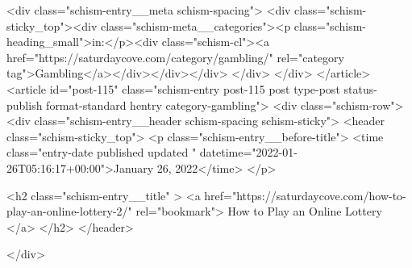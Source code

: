 {		<div class="schism-entry__meta schism-spacing">			<div class="schism-sticky_top"><div class="schism-meta__categories"><p class="schism-heading_small">in:</p><div class="schism-cl"><a href="https://saturdaycove.com/category/gambling/" rel="category tag">Gambling</a></div></div></div>		</div>
	</div>
</article>
<article id="post-115" class="schism-entry post-115 post type-post status-publish format-standard hentry category-gambling">
	<div class="schism-row">		<div class="schism-entry__header schism-spacing schism-sticky">			<header class="schism-sticky_top">				<p class="schism-entry__before-title">
					<time class="entry-date published updated " datetime="2022-01-26T05:16:17+00:00">January 26, 2022</time>				</p>

				<h2 class="schism-entry__title" >
					<a href="https://saturdaycove.com/how-to-play-an-online-lottery-2/" rel="bookmark">
						How to Play an Online Lottery					</a>
				</h2>
			</header>

					</div>

}
